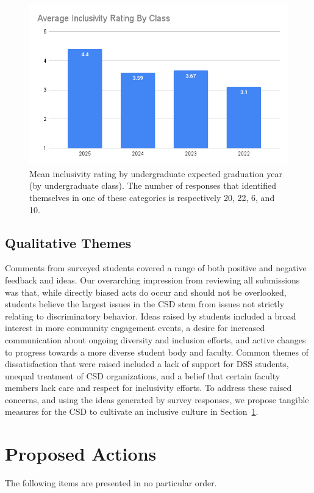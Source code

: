 \documentclass{article}
\begin{document}
\begin{figure}[!h]
\label{class}
\includegraphics[width=\textwidth]{class.png}
\caption{Mean inclusivity rating by undergraduate expected graduation year (by undergraduate class).
The number of responses that identified themselves in 
one of these categories is respectively 20, 22, 6, and 10.}
\end{figure}

\subsection{Qualitative Themes}
Comments from surveyed students covered a range of both positive and negative feedback and ideas. 
Our overarching impression from reviewing 
all submissions was that, while directly biased acts do occur and should not be overlooked,
students believe the largest issues in the CSD stem from issues not strictly relating to discriminatory behavior.
Ideas raised by students included
a broad interest in more community engagement events, a desire for increased communication about 
ongoing diversity and inclusion efforts, and active changes to progress towards a more 
diverse student body and faculty. Common themes of dissatisfaction that
were raised included a lack of support for DSS students, unequal treatment 
of CSD organizations, and a belief that certain faculty members lack care and respect
for inclusivity efforts. To address these raised concerns, and using the ideas generated by survey responses,
we propose tangible measures for the CSD to cultivate an inclusive culture in Section~\ref{proposed actions}.

\section{Proposed Actions}\label{proposed actions}
The following items are presented in no particular order.
\end{document}
